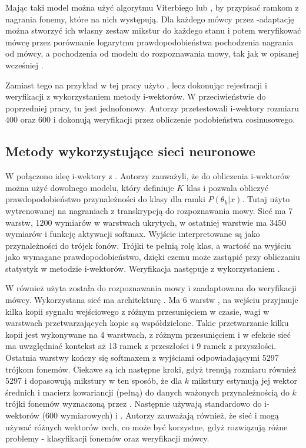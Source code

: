 Mając taki model można użyć algorytmu Viterbiego lub , by przypisać ramkom z nagrania fonemy, które na nich występują. Dla każdego mówcy
przez -adaptację można stworzyć ich własny zestaw mikstur do każdego stanu i potem weryfikować mówcę przez porównanie logarytmu prawdopodobieństwa
pochodzenia nagrania od mówcy, a pochodzenia od modelu do rozpoznawania mowy, tak jak w opisanej wcześniej .

Zamiast tego na przykład w tej pracy \cite{iVectorHmmBased}
użyto , lecz dokonując rejestracji i weryfikacji z wykorzystaniem metody i-wektorów. W przeciwieństwie do poprzedniej pracy, tu  jest jednofonowy. Autorzy przetestowali
i-wektory rozmiaru 400 oraz 600 i dokonują weryfikacji przez obliczenie podobieństwa cosinusowego.

\subsection{Metody wykorzystujące sieci neuronowe}

W \cite{aNovelSchemeFor}
połączono ideę i-wektory z . Autorzy zauważyli, że do obliczenia i-wektorów można użyć dowolnego modelu, który definiuje $K$ klas i pozwala obliczyć prawdopodobieństwo
przynależności do klasy dla ramki $P(\theta_k | x)$.
Tutaj użyto  wytrenowanej na nagraniach z transkrypcją do rozpoznawania mowy. Sieć ma 7 warstw, 1200 wymiarów w warstwach ukrytych, w ostatniej warstwie ma 3450 wymiarów i funkcję aktywacji softmax. 
Wyjście interpretowane są jako przynależności do trójek fonów. Trójki te pełnią rolę klas, a wartość na wyjściu jako wymagane prawdopodobieństwo, dzięki czemu  może zastąpić 
przy obliczaniu statystyk w metodzie i-wektorów. Weryfikacja następuje z wykorzystaniem .

W \cite{timeDelayDeep}
również użyta została  do rozpoznawania mowy i zaadaptowana do weryfikacji mówcy. Wykorzystana sieć ma architekturę . Ma 6 warstw ,
na wejściu przyjmuje kilka kopii sygnału wejściowego z różnym przesunięciem w czasie, wagi w warstwach przetwarzających kopie są współdzielone. Takie przetwarzanie kilku kopii jest wykonywane na
4 warstwach, z różnym przesunięciem i w efekcie sieć ma uwzględniać kontekst aż 13 ramek z przeszłości i 9 ramek z przyszłości. Ostatnia warstwy kończy się softmaxem z wyjściami odpowiadającymi 5297 trójkom fonemów.
Ciekawe są ich następne kroki, gdyż trenują  rozmiaru również 5297 i dopasowują mikstury w ten sposób, że dla $k$ mikstury estymują jej wektor średnich i macierz kowariancji (pełną) 
do danych ważonych przynależnością do $k$ trójki fonemów wyznaczoną przez . Następnie używają  standardowo do i-wektorów (600 wymiarowych) i .
Autorzy zauważają również, że sieć i  mogą używać różnych wektorów cech, co może być korzystne, gdyż rozwiązują różne problemy - klasyfikacji fonemów oraz weryfikacji mówcy.

